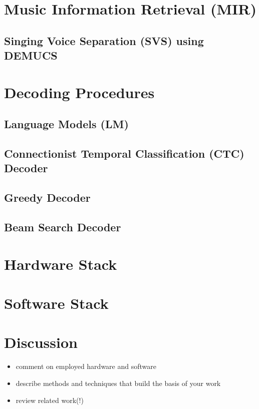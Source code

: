 \section{Music Information Retrieval (MIR)}%
\label{sec:musicinformationretrieval}

\subsection{Singing Voice Separation (SVS) using DEMUCS}%
\label{sec:demucs}

\section{Decoding Procedures}%
\label{sec:musicinformationretrieval}

\subsection{Language Models (LM)}%
\label{sec:languagemodels}


\subsection{Connectionist Temporal Classification (CTC) Decoder}%
\label{sec:ctcdecoder}


\subsection{Greedy Decoder}%
\label{sec:greedydecoder}

\subsection{Beam Search Decoder}%
\label{sec:beamsearchdecoder}

\section{Hardware Stack}%
\label{sec:hpc}

\section{Software Stack}%
\label{sec:softwarestack}

\section{Discussion}%
\label{sec:foundationaltheorydiscussion}

\begin{itemize}
    \item comment on employed hardware and software
    \item describe methods and techniques that build the basis of your work
    \item review related work(!)

    
\end{itemize}
